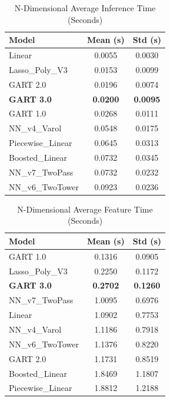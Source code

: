 \documentclass[11pt, a4paper]{article}
\begin{document}
\begin{table}[H]
    \centering
    \caption{N-Dimensional Average Inference Time (Seconds)}
    \label{tab:ndim_inf_time}
    \begin{tabular}{lS[table-format=1.4]S[table-format=1.4]}
        \toprule
        \textbf{Model} & {\textbf{Mean (s)}} & {\textbf{Std (s)}} \\
        \midrule
        Linear & 0.0055 & 0.0030 \\
        Lasso\_Poly\_V3 & 0.0153 & 0.0099 \\
        GART 2.0 & 0.0196 & 0.0074 \\
        \textbf{GART 3.0} & \textbf{0.0200} & \textbf{0.0095} \\
        GART 1.0 & 0.0268 & 0.0111 \\
        NN\_v4\_Varol & 0.0548 & 0.0175 \\
        Piecewise\_Linear & 0.0645 & 0.0313 \\
        Boosted\_Linear & 0.0732 & 0.0345 \\
        NN\_v7\_TwoPass & 0.0732 & 0.0232 \\
        NN\_v6\_TwoTower & 0.0923 & 0.0236 \\
        \bottomrule
    \end{tabular}
\end{table}

\begin{table}[H]
    \centering
    \caption{N-Dimensional Average Feature Time (Seconds)}
    \label{tab:ndim_feature_time}
    \begin{tabular}{lS[table-format=1.4]S[table-format=1.4]}
        \toprule
        \textbf{Model} & {\textbf{Mean (s)}} & {\textbf{Std (s)}} \\
        \midrule
        GART 1.0 & 0.1316 & 0.0905 \\
        Lasso\_Poly\_V3 & 0.2250 & 0.1172 \\
        \textbf{GART 3.0} & \textbf{0.2702} & \textbf{0.1260} \\
        NN\_v7\_TwoPass & 1.0095 & 0.6976 \\
        Linear & 1.0902 & 0.7753 \\
        NN\_v4\_Varol & 1.1186 & 0.7918 \\
        NN\_v6\_TwoTower & 1.1376 & 0.8220 \\
        GART 2.0 & 1.1731 & 0.8519 \\
        Boosted\_Linear & 1.8469 & 1.1807 \\
        Piecewise\_Linear & 1.8812 & 1.2188 \\
        \bottomrule
    \end{tabular}
\end{table}
\end{document}
